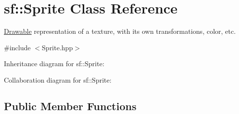 \hypertarget{classsf_1_1_sprite}{}\section{sf\+:\+:Sprite Class Reference}
\label{classsf_1_1_sprite}


\hyperlink{classsf_1_1_drawable}{Drawable} representation of a texture, with its own transformations, color, etc.  




{\ttfamily \#include $<$Sprite.\+hpp$>$}



Inheritance diagram for sf\+:\+:Sprite\+:


Collaboration diagram for sf\+:\+:Sprite\+:
\subsection*{Public Member Functions}
